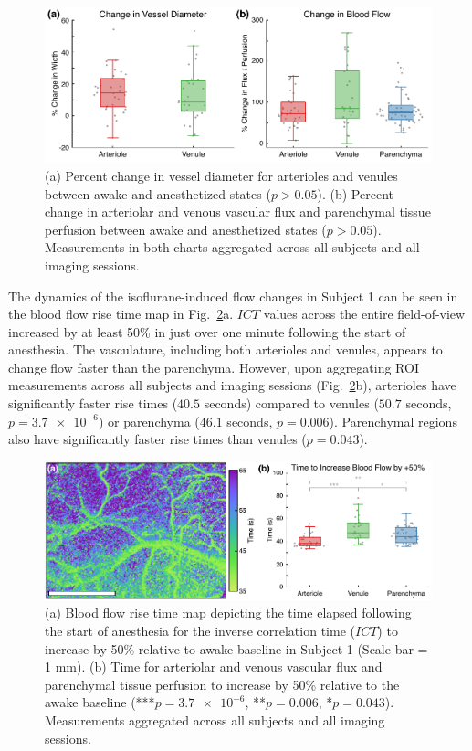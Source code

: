 \documentclass[review]{elsarticle}
\begin{document}
\begin{figure}
    \includegraphics[width=\textwidth]{Figure3.pdf}
    \caption {
        (a) Percent change in vessel diameter for arterioles and venules between awake and anesthetized states ($p > 0.05$). (b) Percent change in arteriolar and venous vascular flux and parenchymal tissue perfusion between awake and anesthetized states ($p > 0.05$). Measurements in both charts aggregated across all subjects and all imaging sessions.
    }
    \label{fig:aggregated}
\end{figure}

The dynamics of the isoflurane-induced flow changes in Subject 1 can be seen in the blood flow rise time map in Fig.~\ref{fig:risetime}a. $ICT$ values across the entire field-of-view increased by at least 50\% in just over one minute following the start of anesthesia. The vasculature, including both arterioles and venules, appears to change flow faster than the parenchyma. However, upon aggregating ROI measurements across all subjects and imaging sessions (Fig.~\ref{fig:risetime}b), arterioles have significantly faster rise times ($40.5$ seconds) compared to venules ($50.7$ seconds, $p = \num{3.7e-6}$) or parenchyma ($46.1$ seconds, $p = 0.006$). Parenchymal regions also have significantly faster rise times than venules ($p = 0.043$). 

\begin{figure}
    \includegraphics[width=\textwidth]{Figure4.pdf}
    \caption {
        (a) Blood flow rise time map depicting the time elapsed following the start of anesthesia for the inverse correlation time ($ICT$) to increase by 50\% relative to awake baseline in Subject 1 (Scale bar = 1 mm). (b) Time for arteriolar and venous vascular flux and parenchymal tissue perfusion to increase by 50\% relative to the awake baseline (***$p = \num{3.7e-6}$, **$p = 0.006$, *$p = 0.043$). Measurements aggregated across all subjects and all imaging sessions.
    }
    \label{fig:risetime}
\end{figure}
\end{document}
